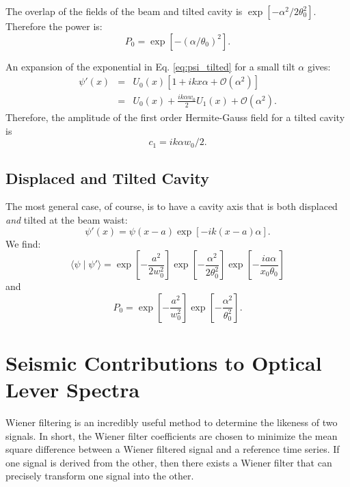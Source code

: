 The overlap of the fields of the beam and tilted cavity is $ \exp{[-\alpha^2/2 \theta_0^2]} $. Therefore the power is:
\begin{equation}
P_0 = \exp{[-(\alpha/\theta_0)^2]}.
\end{equation}

An expansion of the exponential in Eq. \ref{eq:psi_tilted} for a small
tilt $\alpha$ gives:
\begin{eqnarray}
\psi \prime(x) &=& U_0(x) [1 + i k x \alpha + \mathcal{O}(\alpha^2) ] \\
&=& U_0(x) + \frac{i k \alpha w_0}{2} U_1(x) + \mathcal{O}(\alpha^2).
\end{eqnarray}
Therefore, the amplitude of the first order Hermite-Gauss field for a
tilted cavity is 
\begin{equation}
c_1 = i k \alpha w_0 / 2.
\end{equation}


\subsection{Displaced and Tilted Cavity}
The most general case, of course, is to have a cavity axis that is both displaced \emph{and} tilted at the beam waist:
\begin{equation}
\psi \prime(x) = \psi(x-a) \exp{[-i k (x-a) \alpha]}.
\end{equation}
We find:
\begin{equation}
\langle \psi \mid \psi \prime \rangle = \exp{\left[- \frac{a^2}{2 w_0^2} \right]} \exp{\left[-\frac{\alpha^2}{2 \theta_0^2}\right]} \exp{\left[- \frac{i a \alpha}{x_0 \theta_0}\right]}
\end{equation}
and
\begin{equation}
P_0 = \exp{\left[- \frac{a^2}{w_0^2} \right]}
\exp{\left[-\frac{\alpha^2}{\theta_0^2}\right]}.
\label{eq:pwr_disptilt}
\end{equation}



\section{Seismic Contributions to Optical Lever Spectra}
\label{sec:oplev_contributions}
Wiener filtering \cite{Wiener1975Extrapolation} is an incredibly
useful method to determine the likeness of two signals. In short, the
Wiener filter coefficients are chosen to minimize the mean square
difference between a Wiener filtered signal and a reference time
series. If one signal is derived from the other, then there exists a
Wiener filter that can precisely transform one signal into the
other. 

